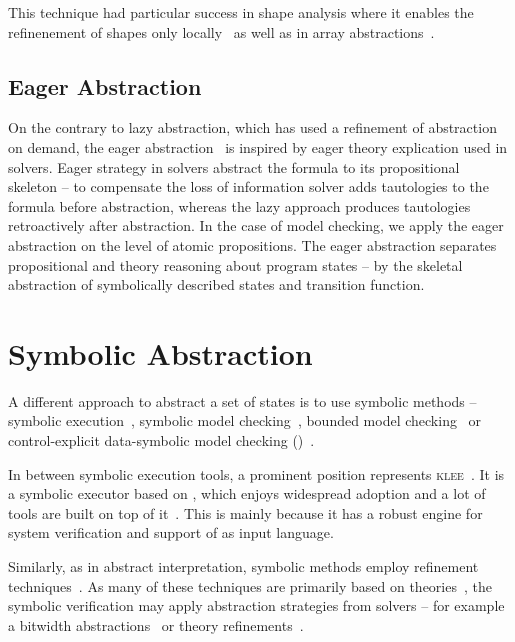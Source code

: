 This technique had particular success in shape analysis where it enables
the refinenement of shapes only locally~\cite{Henzinger2003,Beyer2006a} as well as in array
abstractions~\cite{Alberti2012, Alberti2012b}.

\subsection{Eager Abstraction}

On the contrary to lazy abstraction, which has used a refinement of abstraction
on demand, the eager abstraction~\cite{McMillan2018} is inspired by eager
theory explication used in \smt solvers. Eager strategy in \smt solvers
abstract the formula to its propositional skeleton -- to compensate the loss of
information \smt solver adds tautologies to the formula before abstraction,
whereas the lazy approach produces tautologies retroactively after abstraction.
In the case of model checking, we apply the eager abstraction on the level of
atomic propositions. The eager abstraction separates propositional and theory
reasoning about program states -- by the skeletal abstraction of symbolically
described states and transition function.

\section{Symbolic Abstraction}

A different approach to abstract a set of states is to use symbolic methods --
symbolic execution~\cite{King76, Cadar2013symbolic, Baldoni2018survey}, symbolic model
checking~\cite{Clarke96, McMillan93, Cimatti20}, bounded model
checking~\cite{Biere2003bounded} or control-explicit data-symbolic model
checking (\ceds)~\cite{Mrazek2016}.

In between symbolic execution tools, a prominent position represents
\textsc{klee}~\cite{Cadar2008klee}. It is a symbolic executor based on \llvm,
which enjoys widespread adoption and a lot of tools are built on top of
it~\cite{Beyer2018Klee, Chalupa2018, Chen2018, Menezes2018}. This is mainly because it
has a robust engine for system verification and support of \llvm as input
language.

Similarly, as in abstract interpretation, symbolic methods employ refinement
techniques~\cite{Beyer2016}. As many of these techniques are primarily based on
\smt theories~\cite{Beyer2018}, the symbolic verification may apply abstraction
strategies from solvers -- for example a bitwidth
abstractions~\cite{Jonavs2018} or theory refinements~\cite{Hyvarinen2017}.

